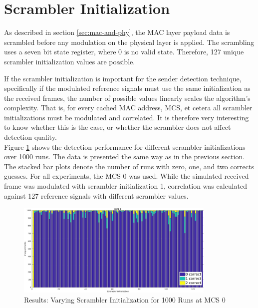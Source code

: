 
\section{Scrambler Initialization}\label{sec:ex-scrambler}

As described in section \ref{sec:mac-and-phy}, the \gls{MAC} layer payload data is scrambled before any modulation on the physical layer is applied. The scrambling uses a seven bit state register, where 0 is no valid state. Therefore, 127 unique scrambler initialization values are possible.

If the scrambler initialization is important for the sender detection technique, specifically if the modulated reference signals must use the same initialization as the received frames, the number of possible values linearly scales the algorithm's complexity. That is, for every cached \gls{MAC} address, \gls{MCS}, et cetera all scrambler initializations must be modulated and correlated. It is therefore very interesting to know whether this is the case, or whether the scrambler does not affect detection quality.\\

Figure \ref{fig:vary_scrambler} shows the detection performance for different scrambler initializations over 1000 runs. The data is presented the same way as in the previous section. The stacked bar plots denote the number of runs with zero, one, and two corrects guesses. For all experiments, the \gls{MCS} 0 was used. While the simulated received frame was modulated with scrambler initialization 1, correlation was calculated against 127 reference signals with different scrambler values.

\begin{figure}[H]
	\centering
	\includegraphics[height=4.5cm]{gfx/plots/scrambler}
	\caption[Results: Varying Scrambler Initialization for 1000 Runs]{Results: Varying Scrambler Initialization for 1000 Runs at MCS 0}
	\label{fig:vary_scrambler}
\end{figure}

